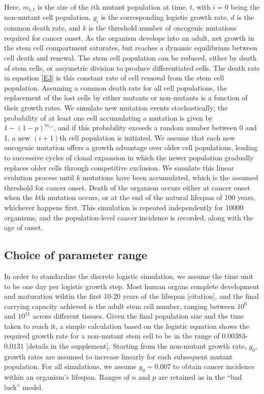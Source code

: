 \documentclass[9pt,twocolumn,twoside]{pnas-new}
\begin{document}
Here, $m_{i, t}$ is the size of the $i$th mutant population at time, $t$, with $i=0$ being the non-mutant cell population, $g_{i}$ is the corresponding logistic growth rate, $d$ is the common death rate, and $k$ is the threshold number of oncogenic mutations required for cancer onset. As the organism develops into an adult, net growth in the stem cell compartment saturates, but reaches a dynamic equilibrium between cell death and renewal. The stem cell population can be reduced, either by death of stem cells, or assymetric division to produce differentiated cells. The death rate in equation \ref{E3} is this constant rate of cell removal from the stem cell population. Assuming a common death rate for all cell populations, the replacement of the lost cells by either mutants or non-mutants is a function of their growth rates. We simulate new mutation events stochastically; the probability of at least one cell accumulating a mutation is given by $1-(1-p)^{m_{i, t}}$, and if this probability exceeds a random number between 0 and 1, a new $(i+1)$th cell population is initiated. We assume that each new oncogenic mutation offers a growth advantage over older cell populations, leading to successive cycles of clonal expansion in which the newer population gradually replaces older cells through competitive exclusion. We simulate this linear evolution process until $k$ mutations have been accumulated, which is the assumed threshold for cancer onset. Death of the organism occurs either at cancer onset when the $k$th mutation occurs, or at the end of the natural lifespan of 100 years, whichever happens first. This simulation is repeated independently for 10000 organisms, and the population-level cancer incidence is recorded, along with the age of onset.
	\subsection*{Choice of parameter range}
	In order to standardize the discrete logistic simulation, we assume the time unit to be one day per logistic growth step. Most human organs complete development and maturation wihtin the first 10-20 years of the lifespan [citation], and the final carrying capacity achieved is the adult stem cell number, ranging between $10^{6}$ and $10^{11}$ across different tissues. Given the final population size and the time taken to reach it, a simple calculation based on the logistic equation shows the required growth rate for a non-mutant stem cell to be in the range of $0.00383$-$0.0131$ [details in the supplement]. Starting from the non-mutant growth rate, $g_{0}$, growth rates are assumed to increase linearly for each subsequent mutant population. For all simulations, we assume $g_{0}=0.007$ to obtain cancer incidence within an organism's lifespan. Ranges of $n$ and $p$ are retained as in the ``bad luck'' model.
\end{document}
